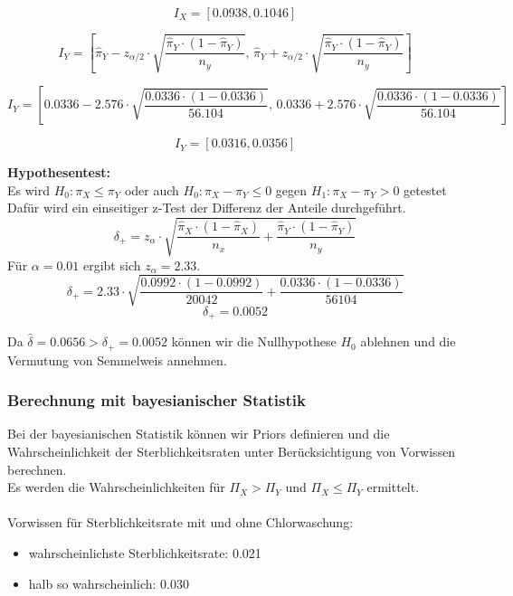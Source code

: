 \documentclass[a4paper,12pt]{article}
\begin{document}
\[
I_X = [0.0938, 0.1046]
\]

\begin{equation}
  I_Y = \left[\hat{\pi}_Y - z_{\alpha/2} \cdot \sqrt{\frac{\hat{\pi}_Y \cdot (1-\hat{\pi}_Y)}{n_y}}, \, 
  \hat{\pi}_Y + z_{\alpha/2} \cdot \sqrt{\frac{\hat{\pi}_Y \cdot (1-\hat{\pi}_Y)}{n_y}}\right]
\end{equation}

\begin{equation}
  I_Y = \left[0.0336 - 2.576 \cdot \sqrt{\frac{0.0336 \cdot (1-0.0336)}{56.104}}, \, 
  0.0336 + 2.576 \cdot \sqrt{\frac{0.0336 \cdot (1-0.0336)}{56.104}}\right]
\end{equation}

\[
I_Y = [0.0316, 0.0356]
\]

\textbf{Hypothesentest:} \\
Es wird $H_0 : \pi_X \leq \pi_Y $ oder auch $H_0 : \pi_X - \pi_Y \leq 0$ gegen $H_1 : \pi_X - \pi_Y > 0$ getestet\\
Dafür wird ein einseitiger z-Test der Differenz der Anteile durchgeführt. \\
\begin{equation}
  \delta_+ = z_{\alpha} \cdot \sqrt{\frac{\hat{\pi}_X \cdot (1-\hat{\pi}_X)}{n_x} + \frac{\hat{\pi}_Y \cdot (1-\hat{\pi}_Y)}{n_y}}
\end{equation}
Für $\alpha = 0.01$ ergibt sich $z_{\alpha} = 2.33$.
\begin{equation}
  \delta_+ = 2.33 \cdot \sqrt{\frac{0.0992 \cdot (1-0.0992)}{20042} + \frac{0.0336 \cdot (1-0.0336)}{56104}}
\end{equation}
\begin{equation}
  \delta_+ = 0.0052
\end{equation}

Da $\hat{\delta} = 0.0656 > \delta_+ = 0.0052$ können wir die Nullhypothese $H_0$ ablehnen und die Vermutung von Semmelweis annehmen.


\subsubsection{Berechnung mit bayesianischer Statistik}
Bei der bayesianischen Statistik können wir Priors definieren und die Wahrscheinlichkeit der 
Sterblichkeitsraten unter Berücksichtigung von Vorwissen berechnen. \\
Es werden die Wahrscheinlichkeiten für $\Pi_X > \Pi_Y$ und $\Pi_X \leq \Pi_Y$ ermittelt. \\\\
Vorwissen für Sterblichkeitsrate mit und ohne Chlorwaschung:
\begin{itemize}
    \item wahrscheinlichste Sterblichkeitsrate: 0.021
    \item halb so wahrscheinlich: 0.030
\end{itemize}
\end{document}
